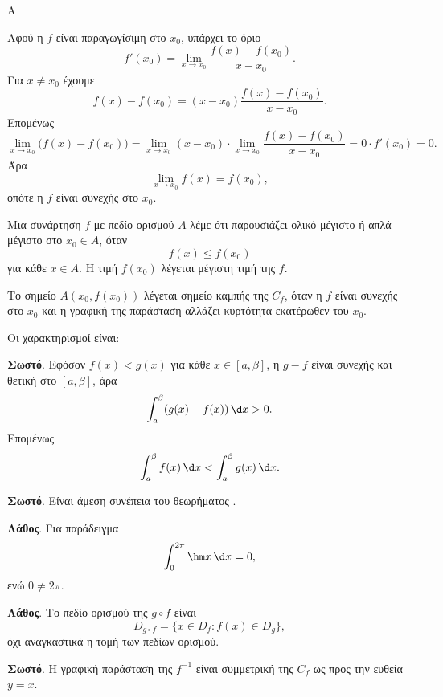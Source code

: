 \begin{thema}{Α}
\begin{erwthma}
\item Αφού η $f$ είναι παραγωγίσιμη στο $x_0$, υπάρχει το όριο
\[
f'(x_0)=\lim_{x\to x_0}\frac{f(x)-f(x_0)}{x-x_0}.
\]
Για $x\neq x_0$ έχουμε
\[
f(x)-f(x_0)=(x-x_0)\frac{f(x)-f(x_0)}{x-x_0}.
\]
Επομένως
\[
\lim_{x\to x_0}\bigl(f(x)-f(x_0)\bigr)
=\lim_{x\to x_0}(x-x_0)\cdot
\lim_{x\to x_0}\frac{f(x)-f(x_0)}{x-x_0}
=0\cdot f'(x_0)=0.
\]
Άρα
\[
\lim_{x\to x_0}f(x)=f(x_0),
\]
οπότε η $f$ είναι συνεχής στο $x_0$.

\item Μια συνάρτηση $f$ με πεδίο ορισμού $A$ λέμε ότι παρουσιάζει ολικό μέγιστο ή απλά μέγιστο στο $x_0\in A$, όταν
\[
f(x)\leq f(x_0)
\]
για κάθε $x\in A$. Η τιμή $f(x_0)$ λέγεται μέγιστη τιμή της $f$.

\item Το σημείο $A(x_0,f(x_0))$ λέγεται σημείο καμπής της $C_f$, όταν η $f$ είναι συνεχής στο $x_0$ και η γραφική της παράσταση αλλάζει κυρτότητα εκατέρωθεν του $x_0$.

\item Οι χαρακτηρισμοί είναι:
\begin{alist}
\item \textbf{Σωστό}. Εφόσον $f(x)<g(x)$ για κάθε $x\in[a,\beta]$, η $g-f$ είναι συνεχής και θετική στο $[a,\beta]$, άρα
\[
\dint_a^\beta (g(x)-f(x))\,\d x>0.
\]
Επομένως
\[
\dint_a^\beta f(x)\,\d x<\dint_a^\beta g(x)\,\d x.
\]
\item \textbf{Σωστό}. Είναι άμεση συνέπεια του θεωρήματος .
\item \textbf{Λάθος}. Για παράδειγμα
\[
\dint_0^{2\pi}\hm x\,\d x=0,
\]
ενώ $0\neq2\pi$.
\item \textbf{Λάθος}. Το πεδίο ορισμού της $g\circ f$ είναι
\[
D_{g\circ f}=\{x\in D_f: f(x)\in D_g\},
\]
όχι αναγκαστικά η τομή των πεδίων ορισμού.
\item \textbf{Σωστό}. Η γραφική παράσταση της $f^{-1}$ είναι συμμετρική της $C_f$ ως προς την ευθεία $y=x$.
\end{alist}
\end{erwthma}
\end{thema}

